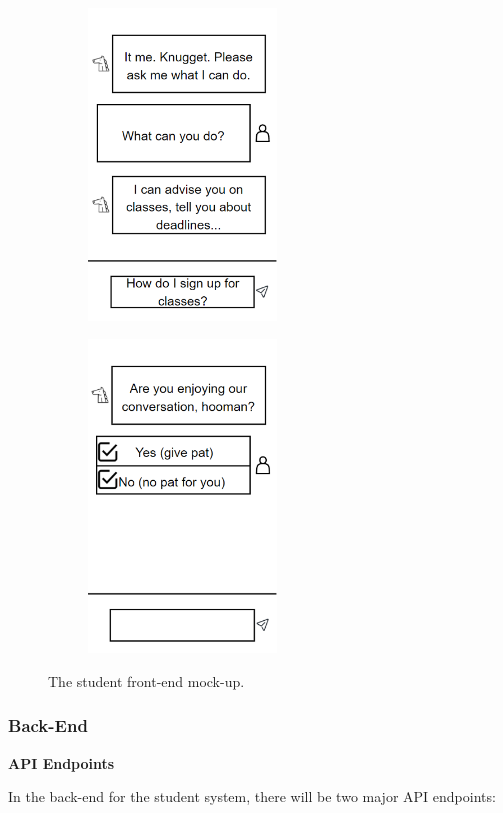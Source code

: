 \documentclass[titlepage, 12pt]{article}
\begin{document}
\begin{figure}[h]
\centering
  \begin{subfigure}{7cm}
    \centering\includegraphics[width=5cm]{images/student-front-1.png}
  \end{subfigure}
  \begin{subfigure}{7cm}
    \centering\includegraphics[width=5cm]{images/student-front-2.png}
  \end{subfigure}
  \caption{The student front-end mock-up.}
\end{figure}

\subsubsection{Back-End}

\textbf{API Endpoints}

In the back-end for the student system, there will be two major API endpoints:
\end{document}
